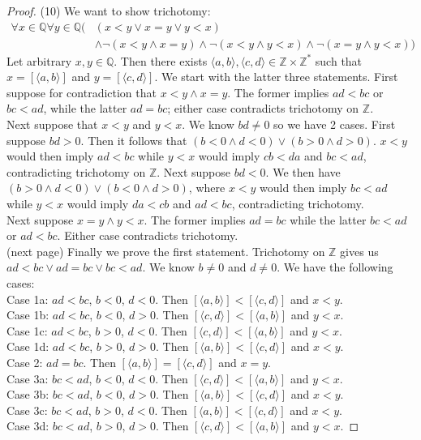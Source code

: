 \documentclass{report}
\begin{document}
\begin{proof}(10)
We want to show trichotomy:
\begin{align*}
\forall x\in\mathbb Q\forall y\in\mathbb Q(&(x<y\lor x=y\lor y<x)\\
&\land\neg(x<y\land x=y)\land\neg(x<y\land y<x)\land\neg(x=y\land y<x))
\end{align*}
Let arbitrary $x,y\in\mathbb Q$.
Then there exists $\langle a,b\rangle,\langle c,d\rangle\in\mathbb Z\times\mathbb Z^*$ such that 
$x=[\langle a,b\rangle]$ and $y=[\langle c,d\rangle]$. We start with the latter three statements. 
First suppose for contradiction that $x<y\land x=y$. The former implies $ad<bc$ or $bc<ad$, while the latter $ad=bc$; either case contradicts trichotomy on $\mathbb Z$.\\
\indent Next suppose that $x<y$ and $y<x$. We know $bd\neq0$ so we have 2 cases. First suppose $bd>0$. Then it follows that $(b<0\land d<0)\lor(b>0\land d>0)$. $x<y$ would then imply $ad<bc$ while 
$y<x$ would imply $cb<da$ and $bc<ad$, contradicting trichotomy on $\mathbb Z$. Next suppose $bd<0$. We then have $(b>0\land d<0)\lor(b<0\land d>0)$, where 
$x<y$ would then imply $bc<ad$ while $y<x$ would imply $da<cb$ and $ad<bc$, contradicting trichotomy.\\
\indent Next suppose $x=y\land y<x$. The former implies $ad=bc$ while the latter $bc<ad$ or $ad<bc$. Either case contradicts trichotomy.
\\
(next page)\newpage
\indent Finally we prove the first statement. Trichotomy on $\mathbb Z$ gives us $ad<bc\lor ad=bc\lor bc<ad$. We know $b\neq0$ and $d\neq0$. We have the following cases:\\
\indent Case 1a: $ad<bc$, $b<0$, $d<0$. Then $[\langle a,b\rangle]<[\langle c,d\rangle]$ and $x<y$.\\
\indent Case 1b: $ad<bc$, $b<0$, $d>0$. Then $[\langle c,d\rangle]<[\langle a,b\rangle]$ and $y<x$.\\
\indent Case 1c: $ad<bc$, $b>0$, $d<0$. Then $[\langle c,d\rangle]<[\langle a,b\rangle]$ and $y<x$.\\
\indent Case 1d: $ad<bc$, $b>0$, $d>0$. Then $[\langle a,b\rangle]<[\langle c,d\rangle]$ and $x<y$.\\
\indent Case 2: $ad=bc$. Then $[\langle a,b\rangle]=[\langle c,d\rangle]$ and $x=y$.\\
\indent Case 3a: $bc<ad$, $b<0$, $d<0$. Then $[\langle c,d\rangle]<[\langle a,b\rangle]$ and $y<x$.\\
\indent Case 3b: $bc<ad$, $b<0$, $d>0$. Then $[\langle a,b\rangle]<[\langle c,d\rangle]$ and $x<y$.\\
\indent Case 3c: $bc<ad$, $b>0$, $d<0$. Then $[\langle a,b\rangle]<[\langle c,d\rangle]$ and $x<y$.\\
\indent Case 3d: $bc<ad$, $b>0$, $d>0$. Then $[\langle c,d\rangle]<[\langle a,b\rangle]$ and $y<x$.
\end{proof}
\end{document}
